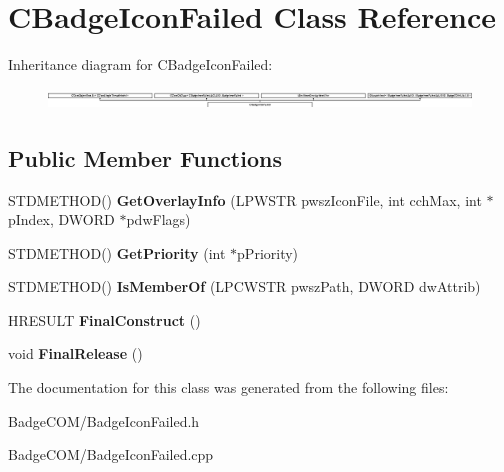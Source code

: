 \hypertarget{class_c_badge_icon_failed}{\section{C\-Badge\-Icon\-Failed Class Reference}
\label{class_c_badge_icon_failed}
}
Inheritance diagram for C\-Badge\-Icon\-Failed\-:\begin{figure}[H]
\begin{center}
\leavevmode
\includegraphics[height=0.555556cm]{class_c_badge_icon_failed}
\end{center}
\end{figure}
\subsection*{Public Member Functions}
\begin{DoxyCompactItemize}
\item 
\hypertarget{class_c_badge_icon_failed_a57eb60eae90248c45f2bf2f32d7081e3}{S\-T\-D\-M\-E\-T\-H\-O\-D() {\bfseries Get\-Overlay\-Info} (L\-P\-W\-S\-T\-R pwsz\-Icon\-File, int cch\-Max, int $\ast$p\-Index, D\-W\-O\-R\-D $\ast$pdw\-Flags)}\label{class_c_badge_icon_failed_a57eb60eae90248c45f2bf2f32d7081e3}

\item 
\hypertarget{class_c_badge_icon_failed_ac8606c0067b07b8ba87bbf06e2ca33d6}{S\-T\-D\-M\-E\-T\-H\-O\-D() {\bfseries Get\-Priority} (int $\ast$p\-Priority)}\label{class_c_badge_icon_failed_ac8606c0067b07b8ba87bbf06e2ca33d6}

\item 
\hypertarget{class_c_badge_icon_failed_a63a60ae90d49b1e3ffc86f40f3e1b558}{S\-T\-D\-M\-E\-T\-H\-O\-D() {\bfseries Is\-Member\-Of} (L\-P\-C\-W\-S\-T\-R pwsz\-Path, D\-W\-O\-R\-D dw\-Attrib)}\label{class_c_badge_icon_failed_a63a60ae90d49b1e3ffc86f40f3e1b558}

\item 
\hypertarget{class_c_badge_icon_failed_ac34c4393a562115326fb028b4a1885f2}{H\-R\-E\-S\-U\-L\-T {\bfseries Final\-Construct} ()}\label{class_c_badge_icon_failed_ac34c4393a562115326fb028b4a1885f2}

\item 
\hypertarget{class_c_badge_icon_failed_a2174b120bfe00b3a5e5040b58a13a6f5}{void {\bfseries Final\-Release} ()}\label{class_c_badge_icon_failed_a2174b120bfe00b3a5e5040b58a13a6f5}

\end{DoxyCompactItemize}


The documentation for this class was generated from the following files\-:\begin{DoxyCompactItemize}
\item 
Badge\-C\-O\-M/Badge\-Icon\-Failed.\-h\item 
Badge\-C\-O\-M/Badge\-Icon\-Failed.\-cpp\end{DoxyCompactItemize}

